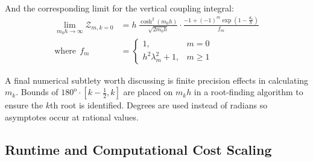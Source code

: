 \begin{appendices}

And the corresponding limit for the vertical coupling integral:
\begin{equation}
\begin{aligned}
    \lim_{m_0h\rightarrow\infty}\boldsymbol{\mathcal{Z}}_{m,k=0} &
    = h~\frac{\cosh^2(m_0h)}{\sqrt{2m_0h}}\cdot \frac{-1+(-1)^m\exp(1-\frac{d_2}{h})}{f_{m}} \\
    \text{where}~~f_m&= \begin{cases}
        1, & m=0 \\
        h^2\lambda_m^2+1, & m \geq 1
    \end{cases}
    \end{aligned}
\end{equation}

A final numerical subtlety worth discussing is finite precision effects in calculating $m_k$. Bounds of $180^\textrm{o}\cdot[k-\frac{1}{2}, k]$ are placed on $m_kh$ in a root-finding algorithm to ensure the $k$th root is identified. Degrees are used instead of radians so asymptotes occur at rational values.

\subsection{Runtime and Computational Cost Scaling}


\end{appendices}
